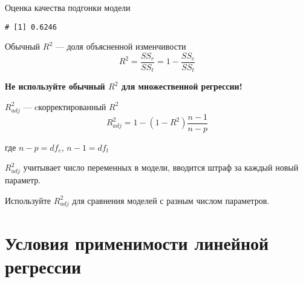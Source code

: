 \documentclass[
  ignorenonframetext,
  t,xcolor=table]{beamer}
\newenvironment{Shaded}{\begin{snugshade}}{\end{snugshade}}
\newcommand{\FunctionTok}[1]{\textcolor[rgb]{0.13,0.29,0.53}{\textbf{#1}}}
\newcommand{\NormalTok}[1]{#1}
\newcommand{\SpecialCharTok}[1]{\textcolor[rgb]{0.81,0.36,0.00}{\textbf{#1}}}
\begin{document}
\begin{frame}[fragile]{Оценка качества подгонки модели}
\protect\hypertarget{ux43eux446ux435ux43dux43aux430-ux43aux430ux447ux435ux441ux442ux432ux430-ux43fux43eux434ux433ux43eux43dux43aux438-ux43cux43eux434ux435ux43bux438}{}
\begin{Shaded}
\end{Shaded}

\begin{verbatim}
# [1] 0.6246
\end{verbatim}

\begin{block}{Обычный \(R^2\) --- доля объясненной изменчивости}
\protect\hypertarget{ux43eux431ux44bux447ux43dux44bux439-r2-ux434ux43eux43bux44f-ux43eux431ux44aux44fux441ux43dux435ux43dux43dux43eux439-ux438ux437ux43cux435ux43dux447ux438ux432ux43eux441ux442ux438}{}
\[R^2 =\frac{SS_{r}}{SS_{t}} = 1 - \frac{SS_{e}}{SS_{t}}\]

\textbf{Не используйте обычный \(R^2\) для множественной регрессии!}
\end{block}

\begin{block}{\(R^2_{adj}\) --- cкорректированный \(R^2\)}
\protect\hypertarget{r2_adj-cux43aux43eux440ux440ux435ux43aux442ux438ux440ux43eux432ux430ux43dux43dux44bux439-r2}{}
\[R^2_{adj} = 1 - (1 - R^2) \frac{n - 1}{n - p}\]

где \(n - p = df_{e}\), \(n - 1 = df_{t}\)

\(R^2_{adj}\) учитывает число переменных в модели, вводится штраф за
каждый новый параметр.

Используйте \(R^2 _{adj}\) для сравнения моделей с разным числом
параметров.
\end{block}
\end{frame}

\hypertarget{ux443ux441ux43bux43eux432ux438ux44f-ux43fux440ux438ux43cux435ux43dux438ux43cux43eux441ux442ux438-ux43bux438ux43dux435ux439ux43dux43eux439-ux440ux435ux433ux440ux435ux441ux441ux438ux438}{%
\section{Условия применимости линейной
регрессии}\label{ux443ux441ux43bux43eux432ux438ux44f-ux43fux440ux438ux43cux435ux43dux438ux43cux43eux441ux442ux438-ux43bux438ux43dux435ux439ux43dux43eux439-ux440ux435ux433ux440ux435ux441ux441ux438ux438}}
\end{document}
